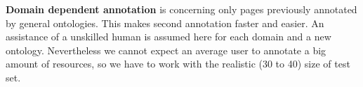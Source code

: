 \documentclass{sig-alternate}
\begin{document}







\textbf{Domain dependent annotation} is concerning only pages previously annotated by general ontologies. This makes second annotation faster and easier. An assistance of a unskilled human is assumed here for each domain and a new ontology. Nevertheless we cannot expect an average user to annotate a big amount of resources, so we have to work with the realistic (30 to 40) size of test set.
\end{document}
